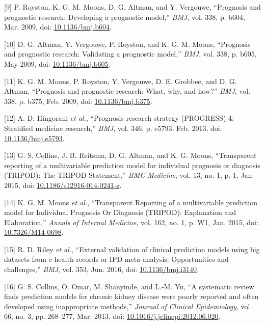 \documentclass[
]{article}
\newenvironment{cslreferences}%
  {}%
  {\par}
\begin{document}
\begin{cslreferences}
\leavevmode\hypertarget{ref-royston_prognosis_2009}{}%
{[}9{]} P. Royston, K. G. M. Moons, D. G. Altman, and Y. Vergouwe, ``Prognosis and prognostic research: Developing a prognostic model,'' \emph{BMJ}, vol. 338, p. b604, Mar. 2009, doi: \href{https://doi.org/10.1136/bmj.b604}{10.1136/bmj.b604}.

\leavevmode\hypertarget{ref-altman_prognosis_2009}{}%
{[}10{]} D. G. Altman, Y. Vergouwe, P. Royston, and K. G. M. Moons, ``Prognosis and prognostic research: Validating a prognostic model,'' \emph{BMJ}, vol. 338, p. b605, May 2009, doi: \href{https://doi.org/10.1136/bmj.b605}{10.1136/bmj.b605}.

\leavevmode\hypertarget{ref-moons_prognosis_2009}{}%
{[}11{]} K. G. M. Moons, P. Royston, Y. Vergouwe, D. E. Grobbee, and D. G. Altman, ``Prognosis and prognostic research: What, why, and how?'' \emph{BMJ}, vol. 338, p. b375, Feb. 2009, doi: \href{https://doi.org/10.1136/bmj.b375}{10.1136/bmj.b375}.

\leavevmode\hypertarget{ref-hingorani_prognosis_2013}{}%
{[}12{]} A. D. Hingorani \emph{et al.}, ``Prognosis research strategy (PROGRESS) 4: Stratified medicine research,'' \emph{BMJ}, vol. 346, p. e5793, Feb. 2013, doi: \href{https://doi.org/10.1136/bmj.e5793}{10.1136/bmj.e5793}.

\leavevmode\hypertarget{ref-collins_transparent_2015}{}%
{[}13{]} G. S. Collins, J. B. Reitsma, D. G. Altman, and K. G. Moons, ``Transparent reporting of a multivariable prediction model for individual prognosis or diagnosis (TRIPOD): The TRIPOD Statement,'' \emph{BMC Medicine}, vol. 13, no. 1, p. 1, Jan. 2015, doi: \href{https://doi.org/10.1186/s12916-014-0241-z}{10.1186/s12916-014-0241-z}.

\leavevmode\hypertarget{ref-moons_transparent_2015}{}%
{[}14{]} K. G. M. Moons \emph{et al.}, ``Transparent Reporting of a multivariable prediction model for Individual Prognosis Or Diagnosis (TRIPOD): Explanation and Elaboration,'' \emph{Annals of Internal Medicine}, vol. 162, no. 1, p. W1, Jan. 2015, doi: \href{https://doi.org/10.7326/M14-0698}{10.7326/M14-0698}.

\leavevmode\hypertarget{ref-riley_external_2016}{}%
{[}15{]} R. D. Riley \emph{et al.}, ``External validation of clinical prediction models using big datasets from e-health records or IPD meta-analysis: Opportunities and challenges,'' \emph{BMJ}, vol. 353, Jun. 2016, doi: \href{https://doi.org/10.1136/bmj.i3140}{10.1136/bmj.i3140}.

\leavevmode\hypertarget{ref-collins_systematic_2013}{}%
{[}16{]} G. S. Collins, O. Omar, M. Shanyinde, and L.-M. Yu, ``A systematic review finds prediction models for chronic kidney disease were poorly reported and often developed using inappropriate methods,'' \emph{Journal of Clinical Epidemiology}, vol. 66, no. 3, pp. 268--277, Mar. 2013, doi: \href{https://doi.org/10.1016/j.jclinepi.2012.06.020}{10.1016/j.jclinepi.2012.06.020}.


\end{cslreferences}
\end{document}
